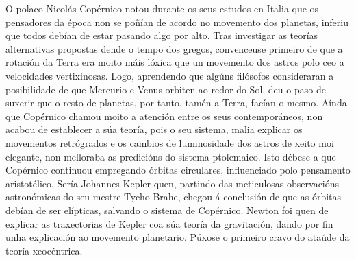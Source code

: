 \begin{refsection}
\begin{multicols}{2}
O polaco Nicolás Copérnico notou durante os seus estudos en Italia que os
pensadores da época non se poñían de acordo no movemento dos planetas, inferiu
que todos debían de estar pasando algo por alto. Tras investigar as teorías
alternativas propostas dende o tempo dos gregos, convenceuse primeiro de que a
rotación da Terra era moito máis lóxica que un movemento dos astros polo ceo a
velocidades vertixinosas. Logo, aprendendo que algúns filósofos consideraran a
posibilidade de que Mercurio e Venus orbiten ao redor do Sol, deu o paso de
suxerir que o resto de planetas, por tanto, tamén a Terra, facían o mesmo.
Aínda que Copérnico chamou moito a atención entre os seus contemporáneos, non
acabou de establecer a súa teoría, pois o seu sistema, malia explicar os
movementos retrógrados e os cambios de luminosidade dos astros de xeito moi
elegante, non melloraba as predicións do sistema ptolemaico. Isto débese a que
Copérnico continuou empregando órbitas circulares, influenciado polo pensamento
aristotélico. Sería Johannes Kepler quen, partindo das meticulosas observacións
astronómicas do seu mestre Tycho Brahe, chegou á conclusión de que as órbitas
debían de ser elípticas, salvando o sistema de Copérnico. Newton foi quen de
explicar as traxectorias de Kepler coa súa teoría da gravitación, dando por fin
unha explicación ao movemento planetario. Púxose o primeiro cravo do ataúde da
teoría xeocéntrica.

\nocite{dreyer.jle_1906}
\nocite{boyer.cb.merzbach.uc_2011}

\printbibliography
\end{multicols}
\end{refsection}
